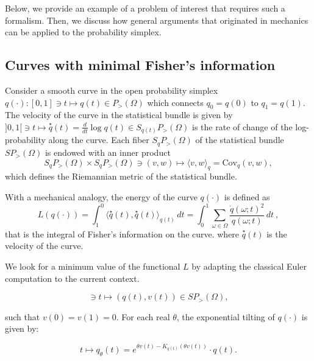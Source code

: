 \documentclass[axioms,article,submit,pdftex,moreauthors]{Definitions/mdpi}
\theoremstyle{plain}
\theoremstyle{remark}
\begin{document}
Below, we provide an example of a problem of interest that requires such a formalism. Then, we discuss how general arguments that originated in mechanics can be applied to the probability simplex.

\subsection{Curves with minimal Fisher's information}
\label{sec:miniml-Fisher-I}
Consider a smooth curve in the open probability simplex $q(\cdot) : [0, 1] \ni t \mapsto q(t) \in P_> (\Omega)$
which connects \( q_0 = q(0) \) to \( q_1 = q(1) \). The velocity of the curve in the statistical bundle is given by 
$]0, 1[ \ni t \mapsto \overset{\star}{q}(t) = \frac{d}{dt} \log q(t) \in S_{q(t)}P_> (\Omega)$ is the rate of change of the log-probability along the curve. Each fiber \( S_q P_> (\Omega) \) of the statistical bundle \( SP_> (\Omega) \) is endowed with an inner product \begin{equation*} 
S_q P_> (\Omega) \times S_q P_> (\Omega) \ni (v, w) \mapsto \langle v, w \rangle_q = \text{Cov}_q (v, w),
\end{equation*} 
which defines the Riemannian metric of the statistical bundle.

With a mechanical analogy, the energy of the curve \( q(\cdot) \) is defined as
\begin{equation} \label{eq:minimal-Fisher} 
L(q(\cdot)) = \int_1^0 \langle \overset{\star}{q}(t), \overset{\star}{q}(t) \rangle_{q(t)} \, dt = \int_0^1 \sum_{\omega \in \Omega} \frac{\dot{q}(\omega; t)^2}{q(\omega; t)} \, dt \ ,
\end{equation} 
that is the integral of Fisher's information on the curve.
where \( \overset{\star}{q}(t) \) is the velocity of the curve.

We look for a minimum value of the functional $L$ by adapting the classical Euler computation to the current context. 

\begin{equation*} 
[0, 1] \ni t \mapsto (q(t), v(t)) \in SP_> (\Omega),
\end{equation*} 

such that \( v(0) = v(1) = 0 \). For each real \( \theta \), the exponential tilting of \( q(\cdot) \) is given by:

\begin{equation*} 
t \mapsto q_{\theta}(t) = e^{\theta v(t) - K_{q(t)}(\theta v(t))} \cdot q(t).
\end{equation*} 
\end{document}
